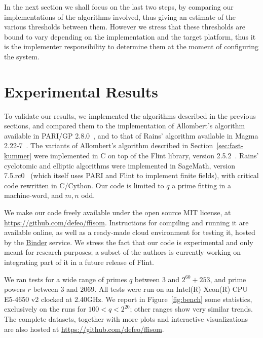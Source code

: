 \documentclass{mcom-l}
\theoremstyle{plain}
\theoremstyle{definition}
\newcounter{algorithm}
\begin{document}
In the next section we shall focus on the last two steps, by comparing
our implementations of the
algorithms involved, thus giving an estimate of the various thresholds
between them.  However we stress that these thresholds are bound to
vary depending on the implementation and the target platform, thus it
is the implementer responsibility to determine them at the moment of
configuring the system.


\section{Experimental Results}
\label{sec:experimental-results}

To validate our results, we implemented the algorithms described in
the previous sections, and compared them to the implementation of
Allombert's algorithm available in PARI/GP 2.8.0~\cite{Pari}, and to
that of Rains' algorithm available in Magma 2.22-7~\cite{MAGMA}. %
The variants of Allombert's algorithm described in
Section~\ref{sec:fast-kummer} were implemented in C on top of the
Flint library, version 2.5.2~\cite{hart2010flint}. %
Rains' cyclotomic and elliptic algorithms were implemented in
SageMath, version 7.5.rc0~\cite{Sage} (which itself uses PARI and
Flint to implement finite fields), with critical code rewritten in
C/Cython. %
Our code is limited to $q$ a prime fitting in a machine-word, and
$m,n$ odd.

We make our code freely available under the open source MIT license,
at \url{https://github.com/defeo/ffisom}. %
Instructions for compiling and running it are available online, as
well as a ready-made cloud environment for testing it, hosted by the
\href{https://mybinder.org/}{Binder} service. %
We stress the fact that our code is experimental and only meant for
research purposes; a subset of the authors is currently working on
integrating part of it in a future release of Flint.

We ran tests for a wide range of primes $q$ between $3$ and
$2^{60}+253$, and prime powers $r$ between $3$ and $2069$. %
All tests were run on an Intel(R) Xeon(R) CPU E5-4650 v2 clocked at
2.40GHz. %
We report in Figure~\ref{fig:bench} some statistics, exclusively on
the runs for $100<q<2^{20}$; other ranges show very similar trends. %
The complete datasets, together with more plots and interactive
visualizations are also hosted at
\url{https://github.com/defeo/ffisom}.
\end{document}
